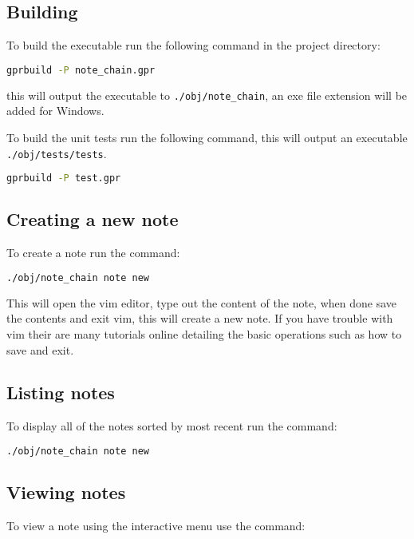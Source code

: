 \documentclass[12pt,a4paper]{article}
\newcommand{\codetext}[1]{\colorbox{light-gray}{\texttt{#1}}}
\begin{document}
\subsection{Building}
To build the executable run the following command in the project directory:

\begin{lstlisting}[language=bash]
  gprbuild -P note_chain.gpr
\end{lstlisting}

\noindent
this will output the executable to \codetext{./obj/note\_chain}, an exe file
extension will be added for Windows.

\par \noindent
To build the unit tests run the following command, this will output an
executable \codetext{./obj/tests/tests}.

\begin{lstlisting}[language=bash]
  gprbuild -P test.gpr
\end{lstlisting}

\subsection{Creating a new note}
To create a note run the command:

\begin{lstlisting}[language=bash]
  ./obj/note_chain note new
\end{lstlisting}

\noindent
This will open the vim editor, type out the content of the note, when done save
the contents and exit vim, this will create a new note. If you have trouble
with vim their are many tutorials online detailing the basic operations such as
how to save and exit.

\subsection{Listing notes}
To display all of the notes sorted by most recent run the command:

\begin{lstlisting}[language=bash]
  ./obj/note_chain note new
\end{lstlisting}


\subsection{Viewing notes}
To view a note using the interactive menu use the command:
\end{document}
